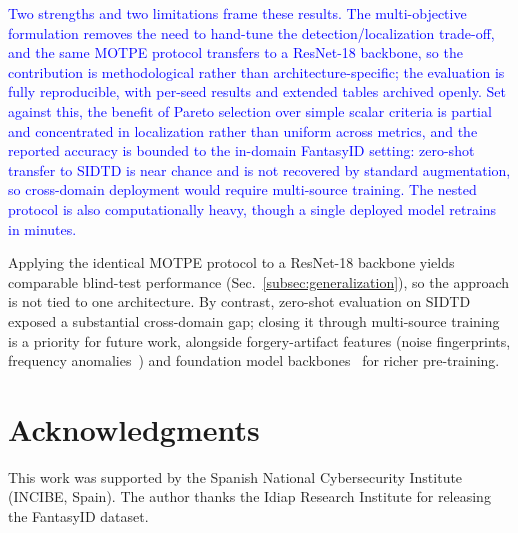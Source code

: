 \documentclass[final,5p,times,twocolumn,number]{elsarticle}
\newcommand{\rev}[1]{#1}
\newcommand{\revB}[1]{\textcolor{blue}{#1}}
\begin{document}
\revB{Two strengths and two limitations frame these results. The multi-objective
formulation removes the need to hand-tune the detection/localization trade-off, and
the same MOTPE protocol transfers to a ResNet-18 backbone, so the contribution is
methodological rather than architecture-specific; the evaluation is fully
reproducible, with per-seed results and extended tables archived openly. Set against
this, the benefit of Pareto selection over simple scalar criteria is partial and
concentrated in localization rather than uniform across metrics, and the reported
accuracy is bounded to the in-domain FantasyID setting: zero-shot transfer to SIDTD
is near chance and is not recovered by standard augmentation, so cross-domain
deployment would require multi-source training. The nested protocol is also
computationally heavy, though a single deployed model retrains in minutes.}

\rev{Applying the identical MOTPE protocol to a ResNet-18 backbone yields
comparable blind-test performance (Sec.~\ref{subsec:generalization}), so the
approach is not tied to one architecture. By contrast, zero-shot evaluation on
SIDTD exposed a substantial cross-domain gap; closing it through multi-source
training is a priority for future work}, alongside forgery-artifact features
(noise fingerprints, frequency anomalies~\citep{cozzolino2020noiseprint}) and
foundation model backbones~\citep{fakeidet2025} for richer pre-training.

\section*{Acknowledgments}
This work was supported by the Spanish National Cybersecurity Institute (INCIBE,
Spain). The author thanks the Idiap Research Institute for releasing the
FantasyID dataset.

\end{document}
